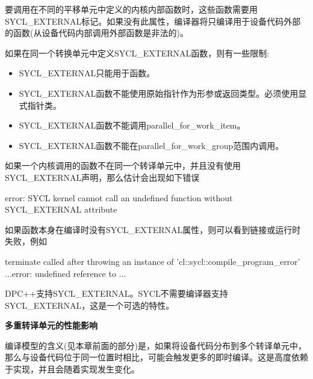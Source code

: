 要调用在不同的平移单元中定义的内核内部函数时，这些函数需要用SYCL\_EXTERNAL标记。如果没有此属性，编译器将只编译用于设备代码外部的函数(从设备代码内部调用外部函数是非法的)。\par

如果在同一个转换单元中定义SYCL\_EXTERNAL函数，则有一些限制:\par

\begin{itemize}
	\item SYCL\_EXTERNAL只能用于函数。
	\item SYCL\_EXTERNAL函数不能使用原始指针作为形参或返回类型。必须使用显式指针类。
	\item SYCL\_EXTERNAL函数不能调用parallel\_for\_work\_item。
	\item SYCL\_EXTERNAL函数不能在parallel\_for\_work\_group范围内调用。
\end{itemize}

如果一个内核调用的函数不在同一个转译单元中，并且没有使用SYCL\_EXTERNAL声明，那么估计会出现如下错误\par

\begin{tcolorbox}[colback=white,colframe=black]
error: SYCL kernel cannot call an undefined function without SYCL\_EXTERNAL attribute
\end{tcolorbox}

如果函数本身在编译时没有SYCL\_EXTERNAL属性，则可以看到链接或运行时失败，例如\par

\begin{tcolorbox}[colback=white,colframe=black]
terminate called after throwing an instance of 'cl::sycl::compile\_program\_error' ...error: undefined reference to ...
\end{tcolorbox}

DPC++支持SYCL\_EXTERNAL。SYCL不需要编译器支持SYCL\_EXTERNAL，这是一个可选的特性。\par

\hspace*{\fill} \par %
\textbf{多重转译单元的性能影响}

编译模型的含义(见本章前面的部分)是，如果将设备代码分布到多个转译单元中，那么与设备代码位于同一位置时相比，可能会触发更多的即时编译。这是高度依赖于实现，并且会随着实现发生变化。\par

